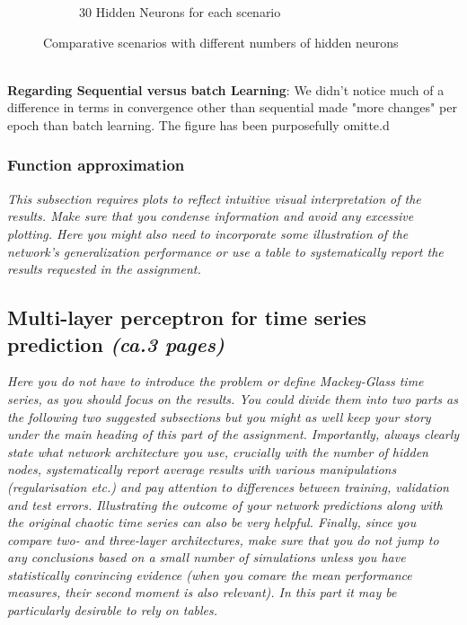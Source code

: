 \documentclass[a4paper]{article}
\begin{document}
\begin{figure}[!htb]
\begin{subfigure}[b]{0.48\textwidth}
        \caption{30 Hidden Neurons for each scenario}
        \label{fig: 30 hidden 3 scenarios}
    \end{subfigure}
    \caption{Comparative scenarios with different numbers of hidden neurons}
    \label{fig: comparative scenarios}
\end{figure}\\
\textbf{Regarding Sequential versus batch Learning}: We didn't notice much of a difference in terms in convergence other than sequential made "more changes" per epoch than batch learning. The figure has been purposefully omitte.d  

\subsubsection{Function approximation}
\textit{This subsection requires plots to reflect intuitive visual interpretation of the results. Make sure that you condense information and avoid any excessive plotting. Here you might also need to incorporate some illustration of the network's generalization performance or use a table to systematically report the results requested in the assignment.}

\subsection{Multi-layer perceptron for time series prediction \textit{(ca.3 pages)}}

\textit{Here you do not have to introduce the problem or define Mackey-Glass time series, as you should focus on the results. You could divide them into two parts as the following two suggested subsections but you might as well keep your story under the main heading of this part of the assignment. Importantly, always clearly state what network architecture you use, crucially with the number of hidden nodes, systematically report average results with various manipulations (regularisation etc.) and pay attention to differences between training, validation and test errors. Illustrating the outcome of your network predictions along with the original chaotic time series can also be very helpful. Finally, since you compare two- and three-layer architectures, make sure that you do not jump to any conclusions based on a small number of simulations unless you have statistically convincing evidence (when you comare the mean performance measures, their second moment is also relevant). In this part it may be particularly desirable to rely on tables.}
\end{document}
